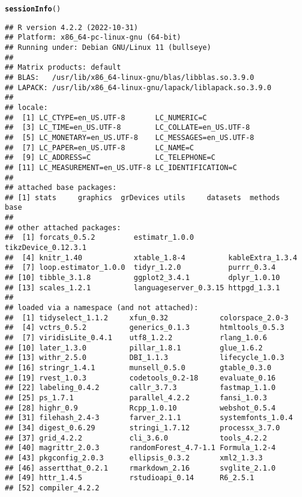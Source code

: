 \documentclass[12pt]{article}\usepackage[]{graphicx}\usepackage[]{xcolor}
\makeatletter
\newcommand{\hlstd}[1]{\textcolor[rgb]{0.345,0.345,0.345}{#1}}%
\newcommand{\hlkwd}[1]{\textcolor[rgb]{0.737,0.353,0.396}{\textbf{#1}}}%
\newenvironment{kframe}{%
 \def\at@end@of@kframe{}%
 \ifinner\ifhmode%
  \def\at@end@of@kframe{\end{minipage}}%
  \begin{minipage}{\columnwidth}%
 \fi\fi%
 \def\FrameCommand##1{\hskip\@totalleftmargin \hskip-\fboxsep
 \colorbox{shadecolor}{##1}\hskip-\fboxsep
     \hskip-\linewidth \hskip-\@totalleftmargin \hskip\columnwidth}%
 \MakeFramed {\advance\hsize-\width
   \@totalleftmargin\z@ \linewidth\hsize
   \@setminipage}}%
 {\par\unskip\endMakeFramed%
 \at@end@of@kframe}
\newenvironment{knitrout}{}{} %
\makeatother
\begin{document}
\begin{knitrout}
\color{fgcolor}\begin{kframe}
\begin{alltt}
\hlkwd{sessionInfo}\hlstd{()}
\end{alltt}
\begin{verbatim}
## R version 4.2.2 (2022-10-31)
## Platform: x86_64-pc-linux-gnu (64-bit)
## Running under: Debian GNU/Linux 11 (bullseye)
## 
## Matrix products: default
## BLAS:   /usr/lib/x86_64-linux-gnu/blas/libblas.so.3.9.0
## LAPACK: /usr/lib/x86_64-linux-gnu/lapack/liblapack.so.3.9.0
## 
## locale:
##  [1] LC_CTYPE=en_US.UTF-8       LC_NUMERIC=C              
##  [3] LC_TIME=en_US.UTF-8        LC_COLLATE=en_US.UTF-8    
##  [5] LC_MONETARY=en_US.UTF-8    LC_MESSAGES=en_US.UTF-8   
##  [7] LC_PAPER=en_US.UTF-8       LC_NAME=C                 
##  [9] LC_ADDRESS=C               LC_TELEPHONE=C            
## [11] LC_MEASUREMENT=en_US.UTF-8 LC_IDENTIFICATION=C       
## 
## attached base packages:
## [1] stats     graphics  grDevices utils     datasets  methods   base     
## 
## other attached packages:
##  [1] forcats_0.5.2         estimatr_1.0.0        tikzDevice_0.12.3.1  
##  [4] knitr_1.40            xtable_1.8-4          kableExtra_1.3.4     
##  [7] loop.estimator_1.0.0  tidyr_1.2.0           purrr_0.3.4          
## [10] tibble_3.1.8          ggplot2_3.4.1         dplyr_1.0.10         
## [13] scales_1.2.1          languageserver_0.3.15 httpgd_1.3.1         
## 
## loaded via a namespace (and not attached):
##  [1] tidyselect_1.1.2     xfun_0.32            colorspace_2.0-3    
##  [4] vctrs_0.5.2          generics_0.1.3       htmltools_0.5.3     
##  [7] viridisLite_0.4.1    utf8_1.2.2           rlang_1.0.6         
## [10] later_1.3.0          pillar_1.8.1         glue_1.6.2          
## [13] withr_2.5.0          DBI_1.1.3            lifecycle_1.0.3     
## [16] stringr_1.4.1        munsell_0.5.0        gtable_0.3.0        
## [19] rvest_1.0.3          codetools_0.2-18     evaluate_0.16       
## [22] labeling_0.4.2       callr_3.7.3          fastmap_1.1.0       
## [25] ps_1.7.1             parallel_4.2.2       fansi_1.0.3         
## [28] highr_0.9            Rcpp_1.0.10          webshot_0.5.4       
## [31] filehash_2.4-3       farver_2.1.1         systemfonts_1.0.4   
## [34] digest_0.6.29        stringi_1.7.12       processx_3.7.0      
## [37] grid_4.2.2           cli_3.6.0            tools_4.2.2         
## [40] magrittr_2.0.3       randomForest_4.7-1.1 Formula_1.2-4       
## [43] pkgconfig_2.0.3      ellipsis_0.3.2       xml2_1.3.3          
## [46] assertthat_0.2.1     rmarkdown_2.16       svglite_2.1.0       
## [49] httr_1.4.5           rstudioapi_0.14      R6_2.5.1            
## [52] compiler_4.2.2
\end{verbatim}
\end{kframe}
\end{knitrout}

\
\end{document}
